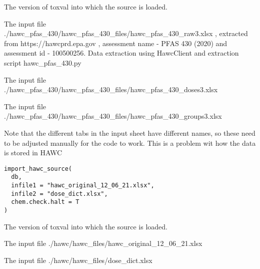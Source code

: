 \documentclass[letterpaper]{book}
\begin{document}
%
\begin{Arguments}
\begin{ldescription}
\item[\code{db}] The version of toxval into which the source is loaded.

\item[\code{infile1}] The input file ./hawc\_pfas\_430/hawc\_pfas\_430\_files/hawc\_pfas\_430\_raw3.xlsx , extracted
from https://hawcprd.epa.gov , assessment name - PFAS 430 (2020) and assessment id - 100500256.
Data extraction using HawcClient and extraction script hawc\_pfas\_430.py

\item[\code{infile2}] The input file ./hawc\_pfas\_430/hawc\_pfas\_430\_files/hawc\_pfas\_430\_doses3.xlsx

\item[\code{infile3}] The input file ./hawc\_pfas\_430/hawc\_pfas\_430\_files/hawc\_pfas\_430\_groups3.xlsx
\end{ldescription}
\end{Arguments}
%
\begin{Description}\relax
Note that the different tabs in the input sheet have different names, so these need
to be adjusted manually for the code to work. This is a problem wit how the data
is stored in HAWC
\end{Description}
%
\begin{Usage}
\begin{verbatim}
import_hawc_source(
  db,
  infile1 = "hawc_original_12_06_21.xlsx",
  infile2 = "dose_dict.xlsx",
  chem.check.halt = T
)
\end{verbatim}
\end{Usage}
%
\begin{Arguments}
\begin{ldescription}
\item[\code{db}] The version of toxval into which the source is loaded.

\item[\code{infile1}] The input file ./hawc/hawc\_files/hawc\_original\_12\_06\_21.xlsx

\item[\code{infile2}] The input file ./hawc/hawc\_files/dose\_dict.xlsx
\end{ldescription}
\end{Arguments}
\end{document}
